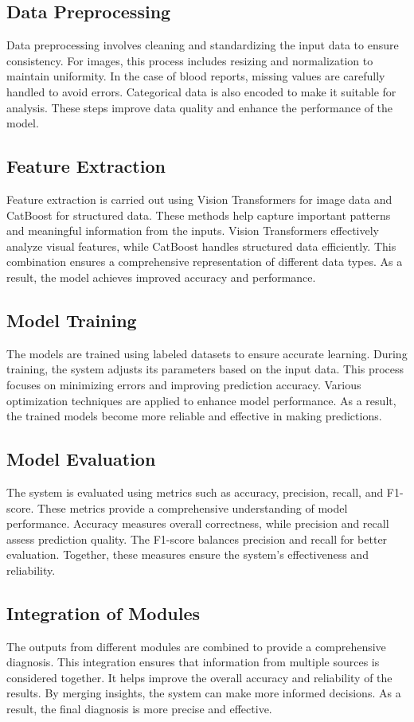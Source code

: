 \documentclass[a4paper,12pt]{report}
\begin{document}
\begin{doublespace}
\subsection{Data Preprocessing}
Data preprocessing involves cleaning and standardizing the input data to ensure consistency. For images, this process includes resizing and normalization to maintain uniformity. In the case of blood reports, missing values are carefully handled to avoid errors. Categorical data is also encoded to make it suitable for analysis. These steps improve data quality and enhance the performance of the model.


\subsection{Feature Extraction}
Feature extraction is carried out using Vision Transformers for image data and CatBoost for structured data. These methods help capture important patterns and meaningful information from the inputs. Vision Transformers effectively analyze visual features, while CatBoost handles structured data efficiently. This combination ensures a comprehensive representation of different data types. As a result, the model achieves improved accuracy and performance.


\subsection{Model Training}
The models are trained using labeled datasets to ensure accurate learning. During training, the system adjusts its parameters based on the input data. This process focuses on minimizing errors and improving prediction accuracy. Various optimization techniques are applied to enhance model performance. As a result, the trained models become more reliable and effective in making predictions.


\subsection{Model Evaluation}
The system is evaluated using metrics such as accuracy, precision, recall, and F1-score. These metrics provide a comprehensive understanding of model performance. Accuracy measures overall correctness, while precision and recall assess prediction quality. The F1-score balances precision and recall for better evaluation. Together, these measures ensure the system’s effectiveness and reliability.


\subsection{Integration of Modules}
The outputs from different modules are combined to provide a comprehensive diagnosis. This integration ensures that information from multiple sources is considered together. It helps improve the overall accuracy and reliability of the results. By merging insights, the system can make more informed decisions. As a result, the final diagnosis is more precise and effective.



\end{doublespace}
\end{document}
